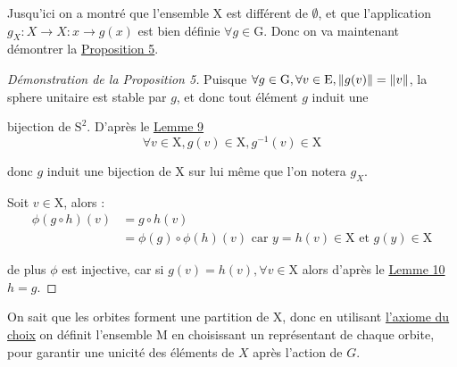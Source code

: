 \noindent
Jusqu'ici on a montré que l'ensemble $\mathrm{X}$ est différent de $\emptyset$, et que l'application $g_X \colon X \to X \colon x \to g(x)$ est bien définie $\forall g \in \mathrm{G}$. Donc on va maintenant démontrer la \hyperref[prop6]{Proposition 5}.\par
\begin{proof}[Démonstration de la Proposition 5]
  \hfill

  Puisque $\forall g \in \mathrm{G}, \forall v \in \mathrm{E}, \left\lVert g(v) \right\rVert = \left\lVert v \right\rVert$, la sphere unitaire est stable par $g$, et donc tout élément $g$ induit une\par bijection de $\mathrm{S}^2$. D'après le \hyperref[lemme11]{Lemme 9} $$\forall v \in \mathrm{X}, g(v) \in \mathrm{X}, g^{-1}(v) \in \mathrm{X}$$\par donc $g$ induit une bijection de $\mathrm{X}$ sur lui même que l'on notera $g_X$. \par
  Soit $v \in \mathrm{X}$, alors :
  \begin{align*}
  \phi(g \circ h)(v) &= g\circ h(v)\\
   &= \phi(g) \circ \phi(h)(v) \text{ car $y=h(v)\in \mathrm{X}$ et $g(y) \in \mathrm{X}$}
  \end{align*}
  \par
  de plus $\phi$ est injective, car si $g(v)=h(v), \forall v \in \mathrm{X}$ alors d'après le \hyperref[lemme12]{Lemme 10} $h=g$.\par
\end{proof}

%
\begin{definition}
  On sait que les orbites forment une partition de $\mathrm{X}$, donc en utilisant \hyperref[axiome]{l'axiome du choix} on définit l'ensemble $\mathrm{M}$ en choisissant un représentant de chaque orbite, pour garantir une unicité des éléments de $X$ après l'action de $G$.
\end{definition}

